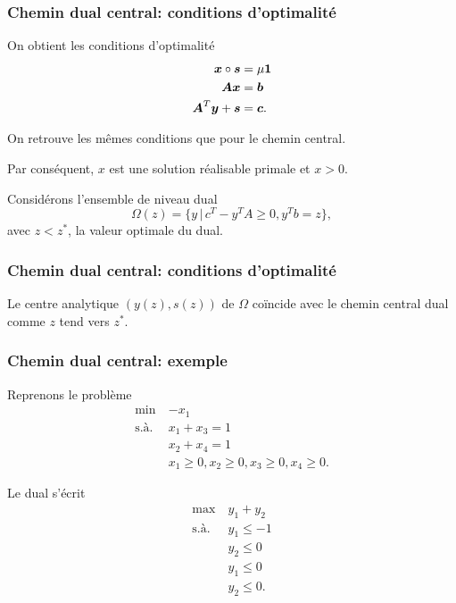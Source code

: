 \documentclass[usepdftitle=false, aspectratio=169]{beamer}
\begin{document}
\begin{frame}
\frametitle{Chemin dual central: conditions d'optimalité}

On obtient les conditions d'optimalité
\begin{align*}
{\boldsymbol{x}} \circ {\boldsymbol{s}} &= \mu {\boldsymbol{1}} \\
{\boldsymbol{A}}{\boldsymbol{x}} &= {\boldsymbol{b}} \\
{\boldsymbol{A}}^T{\boldsymbol{y}} + {\boldsymbol{s}} & = {\boldsymbol{c}}.
\end{align*}

\mbox{}

On retrouve les mêmes conditions que pour le chemin central.

\mbox{}

Par conséquent, $x$ est une solution réalisable primale et $x > 0$.

\mbox{}

Considérons l'ensemble de niveau dual
\[
\Omega(z) = \lbrace y \,|\, c^T - y^T A \geq 0, y^T b = z\rbrace,
\]
avec $z < z^*$, la valeur optimale du dual.

\end{frame}

\begin{frame}
\frametitle{Chemin dual central: conditions d'optimalité}

Le centre analytique $(y(z), s(z))$ de $\Omega$ coïncide avec le chemin central dual comme $z$ tend vers $z^*$.


\end{frame}

\begin{frame}
\frametitle{Chemin dual central: exemple}

Reprenons le problème
\begin{align*}
\min\ & -x_1 \\
\mbox{s.à. } & x_1 + x_3 = 1 \\
& x_2 + x_4 = 1 \\
& x_1 \geq 0, x_2 \geq 0, x_3 \geq 0, x_4 \geq 0.
\end{align*}

Le dual s'écrit
\begin{align*}
\max\ & y_1 + y_2 \\
\mbox{s.à. } & y_1 \leq -1 \\
& y_2 \leq 0 \\
& y_1 \leq 0 \\
& y_2 \leq 0.
\end{align*}

\end{frame}
\end{document}

